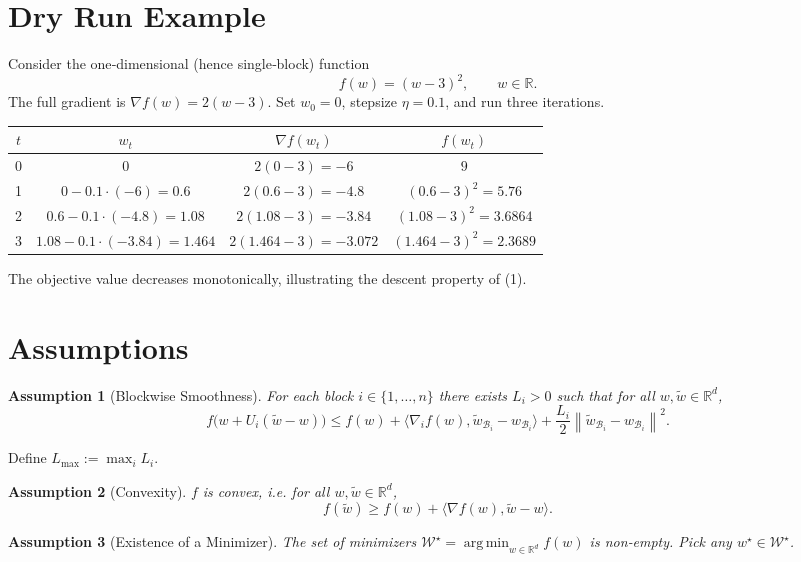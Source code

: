 \documentclass[11pt]{article}
\newtheorem{assumption}{Assumption}
\newcommand{\R}{\mathbb{R}}
\newcommand{\norm}[1]{\left\|#1\right\|}
\newcommand{\inner}[2]{\langle #1,#2\rangle}
\newcommand{\argmin}{\operatorname*{arg\,min}}
\begin{document}
\section*{Dry Run Example}
Consider the one‑dimensional (hence single‑block) function
\[
f(w)=(w-3)^{2},\qquad w\in\R.
\]
The full gradient is $\nabla f(w)=2(w-3)$.  
Set $w_{0}=0$, stepsize $\eta=0.1$, and run three iterations.

\begin{center}
\begin{tabular}{c|c|c|c}
$t$ & $w_{t}$ & $\nabla f(w_{t})$ & $f(w_{t})$\\ \hline
0 & $0$ & $2(0-3)=-6$ & $9$\\
1 & $0-0.1\cdot(-6)=0.6$ & $2(0.6-3)=-4.8$ & $(0.6-3)^{2}=5.76$\\
2 & $0.6-0.1\cdot(-4.8)=1.08$ & $2(1.08-3)=-3.84$ & $(1.08-3)^{2}=3.6864$\\
3 & $1.08-0.1\cdot(-3.84)=1.464$ & $2(1.464-3)=-3.072$ & $(1.464-3)^{2}=2.3689$
\end{tabular}
\end{center}
The objective value decreases monotonically, illustrating the descent
property of (1).

\newpage
\section*{Assumptions}
\begin{assumption}[Blockwise Smoothness]\label{ass:smooth}
For each block $i\in\{1,\dots ,n\}$ there exists $L_{i}>0$ such that for all
$w,\tilde w\in\R^{d}$,
\[
f\bigl(w+U_{i}(\tilde w-w)\bigr)
\le
f(w)+\inner{\nabla_{i} f(w)}{\tilde w_{\mathcal{B}_{i}}-w_{\mathcal{B}_{i}}}
+\frac{L_{i}}{2}\norm{\tilde w_{\mathcal{B}_{i}}-w_{\mathcal{B}_{i}}}^{2}.
\tag{2}
\]
\end{assumption}
Define $L_{\max}:=\max_{i}L_{i}$.

\begin{assumption}[Convexity]\label{ass:convex}
$f$ is convex, i.e. for all $w,\tilde w\in\R^{d}$,
\[
f(\tilde w)\ge f(w)+\inner{\nabla f(w)}{\tilde w-w}.
\tag{3}
\]
\end{assumption}

\begin{assumption}[Existence of a Minimizer]\label{ass:opt}
The set of minimizers $\mathcal{W}^{\star}=\argmin_{w\in\R^{d}}f(w)$ is non‑empty.
Pick any $w^{\star}\in\mathcal{W}^{\star}$.
\end{assumption}
\end{document}
